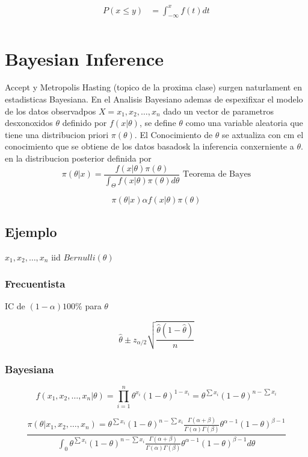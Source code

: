 \documentclass[10pt, oneside]{article}
\begin{document}
\[
	\begin{split}
		P(x \leq y) & = \int_{-\infty}^x f(t) dt \\
	\end{split}
\]

\section{Bayesian Inference}

Accept y Metropolis Hasting (topico de la proxima clase) surgen naturlament en estadisticas Bayesiana. En el Analisis Bayesiano
ademas de espexifixar el modelo de los datos observadpos $X = x_1, x_2, \ldots, x_n$ dado un vector de parametros desxonoxidos $\theta$
definido por $f(x|\theta)$, se define $\theta$ como una variable aleatoria que tiene una distribucion priori $\pi(\theta)$. El
Conocimiento de $\theta$ se axtualiza con cm el conocimiento que se obtiene de los datos basadosk la inferencia conxerniente a $\theta$.
en la distribucion posterior definida por
$$
	\pi(\theta|x) = \frac{f(x|\theta) \pi(\theta)}{\int_{\Theta} f(x|\theta) \pi(\theta) d\theta} \text{ Teorema de Bayes}
$$

$$
	\pi(\theta|x) \alpha f(x|\theta) \pi(\theta)
$$

\subsection{Ejemplo}

$x_1, x_2, \ldots, x_n$ iid $Bernulli(\theta)$

\subsubsection{Frecuentista}

IC de $(1-\alpha)100\%$ para $\theta$

$$
	\hat{\theta} \pm z_{\alpha/2} \sqrt{\frac{\hat{\theta}(1-\hat{\theta})}{n}}
$$


\subsubsection{Bayesiana}

$$
	f(x_1, x_2, \ldots, x_n|\theta) = \prod_{i=1}^{n} \theta^{x_i} (1-\theta)^{1-x_i} = \theta^{\sum x_i} (1-\theta)^{n-\sum x_i}
$$

$$
	\frac{\pi(\theta| x_1, x_2, \ldots, x_n) = \theta^{\sum x_i} (1-\theta)^{n-\sum x_i} \frac{\Gamma(\alpha + \beta)}{\Gamma(\alpha) \Gamma(\beta)}\theta^{\alpha - 1} (1-\theta)^{\beta - 1}}
	{\int_{0} \theta^{\sum x_i} (1-\theta)^{n-\sum x_i} \frac{\Gamma(\alpha + \beta)}{\Gamma(\alpha) \Gamma(\beta)}\theta^{\alpha - 1} (1-\theta)^{\beta - 1} d\theta}
$$
\end{document}
